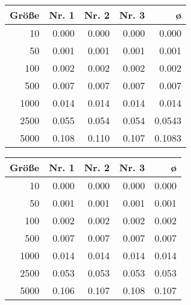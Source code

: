 \documentclass[a4paper, 10pt, twoside, onecolumn, parskip]{scrartcl}
\begin{document}
    \begin{figure}[H]
        \begin{minipage}{.45\textwidth}
            \begin{center}
                \begin{tabular}{|r|r|r|r|r|}
                    \hline
                    Größe & Nr. 1 & Nr. 2 & Nr. 3 & ø \\\hline
                    10 & 0.000 & 0.000 & 0.000 & 0.000 \\\hline
                    50 & 0.001 & 0.001 & 0.001 & 0.001 \\\hline
                    100 & 0.002 & 0.002 & 0.002 & 0.002 \\\hline
                    500 & 0.007 & 0.007 & 0.007 & 0.007 \\\hline
                    1000 & 0.014 & 0.014 & 0.014 & 0.014 \\\hline
                    2500 & 0.055 & 0.054 & 0.054 & 0.0543 \\\hline
                    5000 & 0.108 & 0.110 & 0.107 & 0.1083 \\\hline
                \end{tabular}
            \end{center}
        \end{minipage}\hfill%
        \begin{minipage}{.45\textwidth}
            \begin{center}
                \begin{tabular}{|r|r|r|r|r|}
                    \hline
                    Größe & Nr. 1 & Nr. 2 & Nr. 3 & ø \\\hline
                    10 & 0.000 & 0.000 & 0.000 & 0.000 \\\hline
                    50 & 0.001 & 0.001 & 0.001 & 0.001 \\\hline
                    100 & 0.002 & 0.002 & 0.002 & 0.002 \\\hline
                    500 & 0.007 & 0.007 & 0.007 & 0.007 \\\hline
                    1000 & 0.014 & 0.014 & 0.014 & 0.014 \\\hline
                    2500 & 0.053 & 0.053 & 0.053 & 0.053 \\\hline
                    5000 & 0.106 & 0.107 & 0.108 & 0.107 \\\hline
                \end{tabular}
            \end{center}
        \end{minipage}
    \end{figure}
\end{document}

